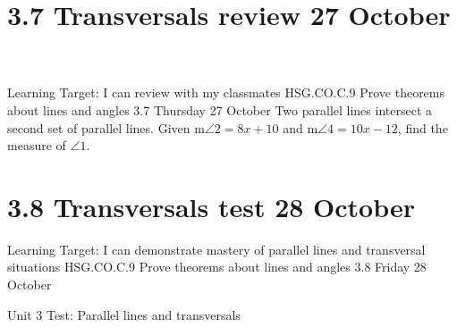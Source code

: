 \documentclass[onlytextwidth, aspectratio=169]{beamer}
\newcommand\paraticks{}
\def\paraticks{{Straight Barb[reversed, scale=2]}-{Straight Barb[scale=2]}}
\begin{document}
\section{3.7 Transversals review \hfill 27 October \,}
\begin{frame}{Learning Target: I can review with my classmates}
  {HSG.CO.C.9 Prove theorems about lines and angles \hfill \alert{3.7 Thursday 27 October}}
  Two parallel lines intersect a second set of parallel lines. Given m$\angle 2 = 8x+10$ and m$\angle 4 = 10x - 12$, find the measure of $\angle 1$. 
  \begin{flushright}
    \end{flushright}
\end{frame}

\section{3.8 Transversals test \hfill 28 October \,}
\begin{frame}{Learning Target: I can demonstrate mastery of parallel lines and transversal situations}
  {HSG.CO.C.9 Prove theorems about lines and angles \hfill \alert{3.8 Friday 28 October \,}}

  \alert{Unit 3 Test: Parallel lines and transversals}

\end{frame}
\end{document}
